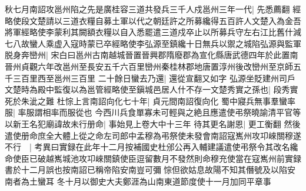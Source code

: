 秋七月南詔攻邕州陷之先是廣桂容三道共發兵三千人戍邕州三年一代|{
	先悉薦翻}
經略使段文楚請以三道衣糧自募土軍以代之朝廷許之所募纔得五百許人文楚入為金吾將軍經略使李蒙利其闕額衣糧以自入悉罷遣三道戍卒止以所募兵守左右江比舊什減七八故蠻人乘虚入寇時蒙已卒經略使李弘源至鎮纔十日無兵以禦之城陷弘源與監軍脱身奔巒州|{
	宋白曰邕州古南越城晉置晉興郡隋廢郡為宣化縣唐武德四年於此置南晉州貞觀六年改邕州至長安五千六百里巒州秦桂林郡地唐置淳州後改巒州至京師五千三百里西至邕州三百里}
二十餘日蠻去乃還|{
	還從宣翻又如字}
弘源坐貶建州司戶文楚時為殿中監復以為邕管經略使至鎭城邑居人什不存一文楚秀實之孫也|{
	段秀實死於朱泚之難}
杜悰上言南詔向化七十年|{
	貞元間南詔復向化}
蜀中寢兵無事羣蠻率服|{
	率服謂相率而服從也}
今西川兵食單寡未可輕與之絶且應遣使弔祭曉諭清平官等以新王名犯廟諱故未行册命|{
	事始見上卷大中十三年}
待其更名謝恩|{
	更工衡翻}
然後遣使册命庶全大體上從之命左司郎中孟穆為弔祭使未發會南詔寇嶲州攻卭崍關穆遂不行　|{
	考異曰實録在此年十二月按補國史杜邠公再入輔建議遣使弔祭令其改名纔命使臣已破越嶲城池攻卭崍關鎮使臣逗留數月不發然則命穆充使當在寇嶲州前實録書於十二月誤也按南詔已稱帝陷安南豈可彌悰但欲姑息故陽不知其僭號及以陷安南者為土蠻耳}
冬十月以御史大夫鄭涯為山南東道節度使十一月加同平章事

